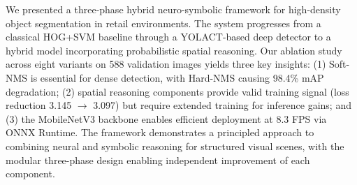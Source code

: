 \documentclass[conference]{IEEEtran}
\begin{document}
We presented a three-phase hybrid neuro-symbolic framework for high-density
object segmentation in retail environments. The system progresses from a
classical HOG+SVM baseline through a YOLACT-based deep detector to a hybrid
model incorporating probabilistic spatial reasoning. Our ablation study across
eight variants on 588 validation images yields three key insights:
(1) Soft-NMS is essential for dense detection, with Hard-NMS causing 98.4\%
mAP degradation; (2) spatial reasoning components provide valid training signal
(loss reduction 3.145 $\to$ 3.097) but require extended training for inference
gains; and (3) the MobileNetV3 backbone enables efficient deployment at 8.3 FPS
via ONNX Runtime. The framework demonstrates a principled approach to combining
neural and symbolic reasoning for structured visual scenes, with the modular
three-phase design enabling independent improvement of each component.
\end{document}
